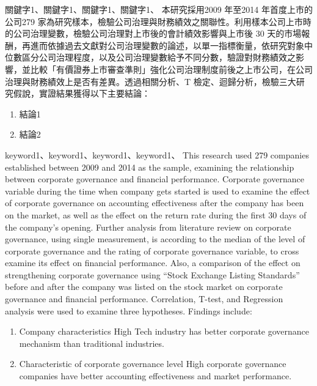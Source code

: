 \documentclass[writingLanguage=chinese,
    addPageTitle=on,
    addDeclaration=on,
    addMUSTlog=off,
    addFigTOC=on,   
    addTabTOC=on,
    refIndent=on,
    printMod=off,
]{.def/must}
\begin{document}
\begin{abstract@cn}{關鍵字1、關鍵字1、關鍵字1、關鍵字1、}
本研究採用2009 年至2014 年首度上市的公司279 家為研究樣本，檢驗公司治理與財務績效之關聯性。利用樣本公司上市時的公司治理變數，檢驗公司治理對上市後的會計績效影響與上市後 30 天的市場報酬，再進而依據過去文獻對公司治理變數的論述，以單一指標衡量，依研究對象中位數區分公司治理程度，以及公司治理變數給予不同分數，驗證對財務績效之影響，並比較「有價證券上市審查準則」強化公司治理制度前後之上市公司，在公司治理與財務績效上是否有差異。透過相關分析、T 檢定、迴歸分析，檢驗三大研究假說，實證結果獲得以下主要結論： 
\begin{enumerate}[label=\arabic*).]
\item 結論1
\item 結論2 
\end{enumerate}
\end{abstract@cn}

\begin{abstract@en}{keyword1、keyword1、keyword1、keyword1、}
This research used 279 companies established between 2009 and 2014 as the
sample, examining the relationship between corporate governance and financial
performance. Corporate governance variable during the time when company
gets started is used to examine the effect of corporate governance on accounting
effectiveness after the company has been on the market, as well as the effect on
the return rate during the first 30 days of the company’s opening. Further
analysis from literature review on corporate governance, using single
measurement, is according to the median of the level of corporate governance
and the rating of corporate governance variable, to cross examine its effect on
financial performance. Also, a comparison of the effect on strengthening
corporate governance using “Stock Exchange Listing Standards” before and
after the company was listed on the stock market on corporate governance and
financial performance. Correlation, T-test, and Regression analysis were used to
examine three hypotheses. Findings include:
\begin{enumerate}[label=\roman*).]
    \item Company characteristics
High Tech industry has better corporate governance mechanism than traditional
industries.
  \item Characteristic of corporate governance level
High corporate governance companies have better accounting effectiveness and
market performance.
\end{enumerate}
\end{abstract@en}
\end{document}
